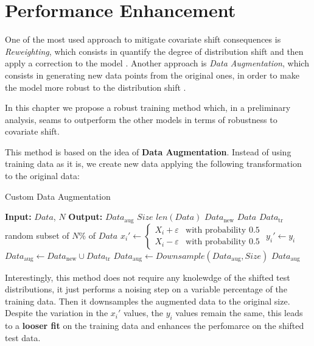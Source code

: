 \chapter{Performance Enhancement}

One of the most used approach to mitigate covariate shift consequences is \textit{Reweighting}, which consists in quantify the degree of distribution shift and then apply a correction to the model \cite{zhang}. Another approach is \textit{Data Augmentation}, which consists in generating new data points from the original ones, in order to make the model more robust to the distribution shift \cite{zhao}. 

In this chapter we propose a robust training method which, in a preliminary analysis, seams to outperform the other models in terms of robustness to covariate shift.

This method is based on the idea of \textbf{Data Augmentation}. Instead of using training data as it is, we create new data applying the following transformation to the original data:

\begin{algorithm}[H]
    \caption{Custom Data Augmentation}
    \begin{algorithmic}[1]
        \Statex \textbf{Input:} $Data$, $N$
        \Statex \textbf{Output:} $Data_\text{aug}$
        \Statex
        \State $Size$ \leftarrow $len(Data)$ 
        \State $Data_\text{new}$ \leftarrow $Data$
        \State $Data_\text{tr}$ \leftarrow random subset of $N\%$ of $Data$
            \State $x_i' \leftarrow 
            \begin{cases}
                X_i + \varepsilon & \text{with probability } 0.5 \\
                X_i - \varepsilon & \text{with probability } 0.5
            \end{cases}$
            \State $y_i' \leftarrow y_i$
        \EndFor
        \State $Data_\text{aug} \leftarrow Data_\text{new} \cup Data_\text{tr}$
        \State $Data_\text{aug} \leftarrow Downsample(Data_\text{aug}, Size)$
        \State\Return $Data_\text{aug}$
    \end{algorithmic}
\end{algorithm}

Interestingly, this method does not require any knolewdge of the shifted test distributions, it just performs a noising step on a variable percentage of the training data. Then it downsamples the augmented data to the original size.
Despite the variation in the $x_i'$ values, the $y_i$ values remain the same, this leads to a \textbf{looser fit} on the training data and enhances the perfomarce on the shifted test data.

